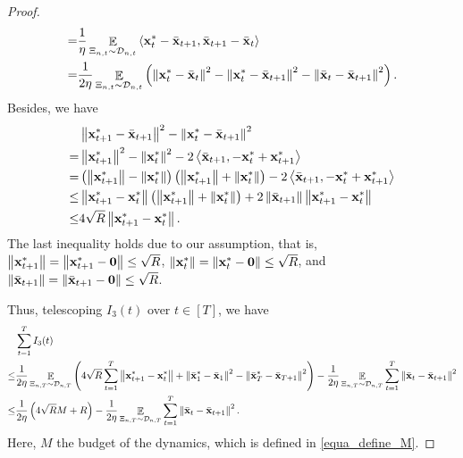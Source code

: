 \documentclass{article}
\begin{document}
\begin{proof}
\begin{align}
= & \frac{1}{\eta}\mathop{\mathbb{E}}_{ \Xi_{n,t} \sim \mathcal{D}_{n,t} }\left\langle {\bf x}_t^\ast - \bar{{\bf x}}_{t+1}, \bar{{\bf x}}_{t+1} - \bar{{\bf x}}_t  \right\rangle \\ \label{equa_I3_temp}
= & \frac{1}{2\eta}\mathop{\mathbb{E}}_{ \Xi_{n,t} \sim \mathcal{D}_{n,t} }\left(  \left\lVert{\bf x}_t^\ast - \bar{{\bf x}}_t\right\rVert^2 - \left\lVert{\bf x}_t^\ast - \bar{{\bf x}}_{t+1}\right\rVert^2 - \left\lVert\bar{{\bf x}}_t - \bar{{\bf x}}_{t+1}\right\rVert^2  \right). 
\end{align} Besides, we have
\begin{align}
\nonumber
& \left\lVert{\bf x}_{t+1}^\ast - \bar{{\bf x}}_{t+1}\right\rVert^2 - \left\lVert{\bf x}_t^\ast - \bar{{\bf x}}_{t+1}\right\rVert^2 \\ \nonumber 
= & \left\lVert{\bf x}_{t+1}^\ast\right\rVert^2 - \left\lVert{\bf x}_t^\ast\right\rVert^2 - 2\left\langle\bar{{\bf x}}_{t+1}, -{\bf x}_t^\ast + {\bf x}_{t+1}^\ast \right\rangle \\ \nonumber
= & \left( \left\lVert{\bf x}_{t+1}^\ast\right\rVert - \left\lVert{\bf x}_t^\ast\right\rVert \right) \left( \left\lVert{\bf x}_{t+1}^\ast\right\rVert + \left\lVert{\bf x}_t^\ast\right\rVert \right) - 2\left\langle\bar{{\bf x}}_{t+1}, -{\bf x}_t^\ast + {\bf x}_{t+1}^\ast \right\rangle \\ \nonumber
\le & \left\lVert{\bf x}_{t+1}^\ast - {\bf x}_t^\ast\right\rVert \left( \left\lVert{\bf x}_{t+1}^\ast\right\rVert + \left\lVert{\bf x}_t^\ast\right\rVert \right) + 2\left\lVert\bar{{\bf x}}_{t+1}\right\rVert \left\lVert{\bf x}_{t+1}^\ast-{\bf x}_t^\ast\right\rVert \\ \nonumber
\le & 4\sqrt{R}\left\lVert{\bf x}_{t+1}^\ast - {\bf x}_t^\ast\right\rVert.   
\end{align} The last inequality holds due to our assumption, that is, $\left\lVert{\bf x}_{t+1}^\ast\right\rVert=\left\lVert{\bf x}_{t+1}^\ast - {\bf 0}\right\rVert\le \sqrt{R}$, $\left\lVert{\bf x}_t^\ast\right\rVert = \left\lVert{\bf x}_t^\ast-{\bf 0}\right\rVert \le \sqrt{R}$, and $\left\lVert\bar{{\bf x}}_{t+1}\right\rVert = \left\lVert\bar{{\bf x}}_{t+1}-{\bf 0}\right\rVert \le \sqrt{R}$. 

Thus, telescoping $I_3(t)$ over $t\in[T]$, we have 
\begin{align}
\nonumber
& \sum_{t=1}^T I_3(t) \\ \nonumber 
\le & \frac{1}{2\eta}\mathop{\mathbb{E}}_{ \Xi_{n,T} \sim \mathcal{D}_{n,T} }\left(  4\sqrt{R}\sum_{t=1}^T\left\lVert{\bf x}_{t+1}^\ast - {\bf x}_t^\ast\right\rVert + \left\lVert\bar{{\bf x}}_1^\ast - \bar{{\bf x}}_1\right\rVert^2 - \left\lVert\bar{{\bf x}}_T^\ast - \bar{{\bf x}}_{T+1}\right\rVert^2  \right) - \frac{1}{2\eta} \mathop{\mathbb{E}}_{ \Xi_{n,T} \sim \mathcal{D}_{n,T} }\sum_{t=1}^T \left\lVert\bar{{\bf x}}_t - \bar{{\bf x}}_{t+1}\right\rVert^2 \\ \nonumber
\le & \frac{1}{2\eta}\left(  4\sqrt{R} M + R  \right) - \frac{1}{2\eta} \mathop{\mathbb{E}}_{ \Xi_{n,T} \sim \mathcal{D}_{n,T} } \sum_{t=1}^T \left\lVert\bar{{\bf x}}_t - \bar{{\bf x}}_{t+1} \right\rVert^2.
\end{align} Here, $M$ the budget of the dynamics, which is defined in \eqref{equa_define_M}.



\end{proof}
\end{document}
